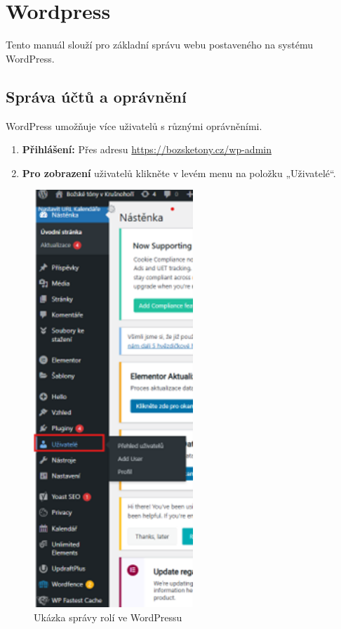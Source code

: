 \documentclass[12pt,a4paper]{article}
\begin{document}
	\newpage
	\section{Wordpress}
	Tento manuál slouží pro základní správu webu postaveného na systému WordPress.
	
	\subsection{Správa účtů a oprávnění}
	WordPress umožňuje více uživatelů s různými oprávněními.
	\begin{enumerate}
		\item \textbf{Přihlášení:} Přes adresu \url{https://bozsketony.cz/wp-admin}
		\item \textbf{Pro zobrazení} uživatelů klikněte v levém menu na položku „Uživatelé“.
	\end{enumerate}

	\begin{figure}[htp]
		\centering
		\includegraphics[width=6cm]{role}
		\caption{Ukázka správy rolí ve WordPressu}
		\label{fig:role}
	\end{figure}
	
\end{document}
